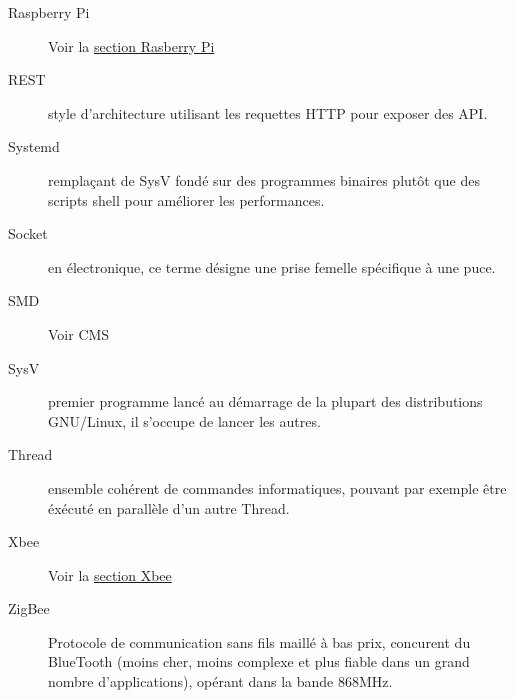 \documentclass{article}
\begin{document}
\begin{description}
    \item[Raspberry Pi] Voir la \hyperref[rpi]{section Rasberry Pi}
    \item[REST] style d’architecture utilisant les requettes HTTP pour exposer des API.
    \item[Systemd] remplaçant de SysV fondé sur des programmes binaires plutôt que des scripts shell pour améliorer les performances.
    \item[Socket] en électronique, ce terme désigne une prise femelle spécifique à une puce.
    \item[SMD] Voir CMS
    \item[SysV] premier programme lancé au démarrage de la plupart des distributions GNU/Linux, il s’occupe de lancer les autres.
    \item[Thread] ensemble cohérent de commandes informatiques, pouvant par exemple être éxécuté en parallèle d’un autre Thread.
    \item[Xbee] Voir la \hyperref[xbee]{section Xbee}
    \item[ZigBee] Protocole de communication sans fils maillé à bas prix, concurent du BlueTooth (moins cher, moins complexe et plus fiable dans un grand nombre d’applications), opérant dans la bande 868MHz.
\end{description}

\clearpage
\end{document}
